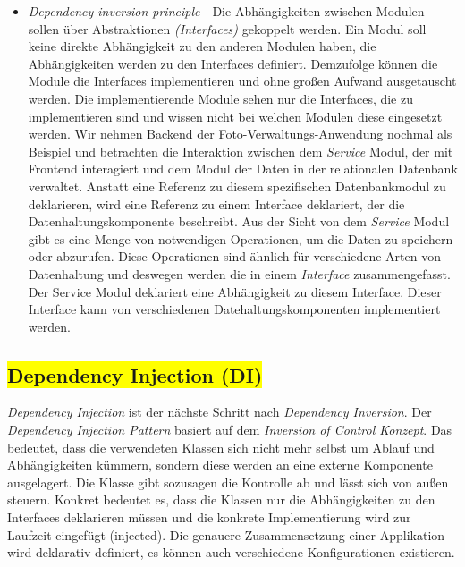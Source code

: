 \begin{itemize}
\item \textit{Dependency inversion principle} - Die Abhängigkeiten zwischen Modulen sollen über Abstraktionen \textit{(Interfaces)} gekoppelt werden. Ein Modul soll keine direkte Abhängigkeit zu den anderen Modulen haben, die Abhängigkeiten werden zu den Interfaces definiert. Demzufolge können die Module die Interfaces implementieren und ohne großen Aufwand ausgetauscht werden. Die implementierende Module sehen nur die Interfaces, die zu implementieren sind und wissen nicht bei welchen Modulen diese eingesetzt werden. Wir nehmen Backend der Foto-Verwaltungs-Anwendung nochmal als Beispiel und betrachten die Interaktion zwischen dem \textit{Service} Modul, der mit Frontend interagiert und dem Modul der Daten in der relationalen Datenbank verwaltet. Anstatt eine Referenz zu diesem spezifischen Datenbankmodul zu deklarieren, wird eine Referenz zu einem Interface deklariert, der die Datenhaltungskomponente beschreibt. Aus der Sicht von dem \textit{Service} Modul gibt es eine Menge von notwendigen Operationen, um die Daten zu speichern oder abzurufen. Diese Operationen sind ähnlich für verschiedene Arten von Datenhaltung und deswegen werden die in einem \textit{Interface} zusammengefasst. Der Service Modul deklariert eine Abhängigkeit zu diesem Interface. Dieser Interface kann von verschiedenen Datehaltungskomponenten implementiert werden.

\end{itemize}

\subsection{\colorbox{yellow}{Dependency Injection (DI)}}\label{di}

\textit{Dependency Injection} ist der nächste Schritt nach \textit{Dependency Inversion}. Der \textit{Dependency Injection Pattern} basiert auf dem \textit{Inversion of Control Konzept}. Das bedeutet, dass die verwendeten Klassen sich nicht mehr selbst um Ablauf und Abhängigkeiten kümmern, sondern diese werden an eine externe Komponente ausgelagert. Die Klasse gibt sozusagen die Kontrolle ab und lässt sich von außen steuern. Konkret bedeutet es, dass die Klassen nur die Abhängigkeiten zu den Interfaces deklarieren müssen und die konkrete Implementierung wird zur Laufzeit eingefügt (injected). Die genauere Zusammensetzung einer Applikation wird deklarativ definiert, es können auch verschiedene Konfigurationen existieren.

